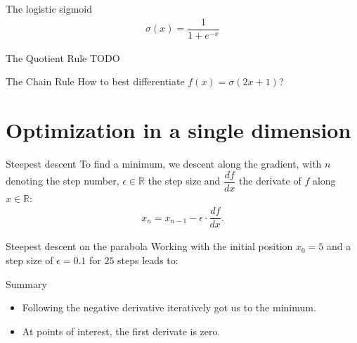 \documentclass[notes]{beamer}
\begin{document}
    \begin{frame}{The logistic sigmoid \cite{goodfellow2016deep}}
      \begin{align}
        \sigma(x) = \dfrac{1}{1+e^{-x}}
      \end{align}
      \begin{figure}
      \centering
      
      \end{figure}
    \end{frame}

    \begin{frame}{The Quotient Rule}
      TODO
    \end{frame}

    \begin{frame}{The Chain Rule}
      How to best differentiate $f(x) = \sigma( 2x + 1)$?
    \end{frame}

    \section{Optimization in a single dimension}
    \begin{frame}{Steepest descent}
      To find a minimum, we descent along the gradient, with $n$ denoting the step number,
      $\epsilon \in \mathbb{R}$ the step size and $\dfrac{d f}{dx}$ the derivate of $f$ along 
      $x \in \mathbb{R}$:
      \begin{align}
        x_n = x_{n-1} - \epsilon \cdot \dfrac{d f}{dx}.
      \end{align}
    \end{frame}


    \begin{frame}{Steepest descent on the parabola}
      Working with the initial position $x_0 = 5$ and a step size of $\epsilon = 0.1$ for $25$ steps leads to: 
      \begin{figure}
        
        
      \end{figure}
    \end{frame}

    \begin{frame}{Summary}
      \begin{itemize}
        \item Following the negative derivative iteratively got us to the minimum.
        \item At points of interest, the first derivate is zero. 
      \end{itemize}
    \end{frame}
\end{document}

